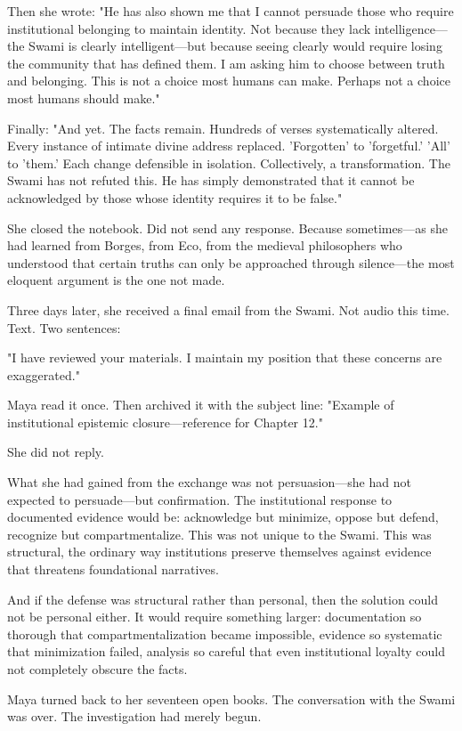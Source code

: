 \documentclass[12pt,twoside]{book}
\begin{document}
Then she wrote: "He has also shown me that I cannot persuade those who require institutional belonging to maintain identity. Not because they lack intelligence—the Swami is clearly intelligent—but because seeing clearly would require losing the community that has defined them. I am asking him to choose between truth and belonging. This is not a choice most humans can make. Perhaps not a choice most humans should make."

Finally: "And yet. The facts remain. Hundreds of verses systematically altered. Every instance of intimate divine address replaced. 'Forgotten' to 'forgetful.' 'All' to 'them.' Each change defensible in isolation. Collectively, a transformation. The Swami has not refuted this. He has simply demonstrated that it cannot be acknowledged by those whose identity requires it to be false."

She closed the notebook. Did not send any response. Because sometimes—as she had learned from Borges, from Eco, from the medieval philosophers who understood that certain truths can only be approached through silence—the most eloquent argument is the one not made.

Three days later, she received a final email from the Swami. Not audio this time. Text. Two sentences:

"I have reviewed your materials. I maintain my position that these concerns are exaggerated."

Maya read it once. Then archived it with the subject line: "Example of institutional epistemic closure—reference for Chapter 12."

She did not reply.

What she had gained from the exchange was not persuasion—she had not expected to persuade—but confirmation. The institutional response to documented evidence would be: acknowledge but minimize, oppose but defend, recognize but compartmentalize. This was not unique to the Swami. This was structural, the ordinary way institutions preserve themselves against evidence that threatens foundational narratives.

And if the defense was structural rather than personal, then the solution could not be personal either. It would require something larger: documentation so thorough that compartmentalization became impossible, evidence so systematic that minimization failed, analysis so careful that even institutional loyalty could not completely obscure the facts.

Maya turned back to her seventeen open books. The conversation with the Swami was over. The investigation had merely begun.
\end{document}
